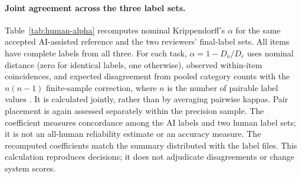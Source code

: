 

\paragraph{Joint agreement across the three label sets.}
Table~\ref{tab:human-alpha} recomputes nominal Krippendorff's $\alpha$ for the same accepted
AI-assisted reference and the two reviewers' final-label sets. All 
items have complete labels from all three. For each task, $\alpha=1-D_o/D_e$ uses nominal
distance (zero for identical labels, one otherwise), observed within-item coincidences,
and expected disagreement from pooled category counts with the $n(n-1)$ finite-sample
correction, where $n$ is the number of pairable label values
\citep[pp.~1--5]{krippendorff2011alpha}. It is calculated jointly, rather than by averaging
pairwise kappas. Pair placement is again assessed separately within the precision sample.
The coefficient measures concordance among the AI labels and two human label sets;
it is not an all-human reliability estimate or an accuracy measure. The recomputed
coefficients match the summary distributed with the label files. This calculation
reproduces decisions; it does not adjudicate disagreements or change system scores.


\fi

